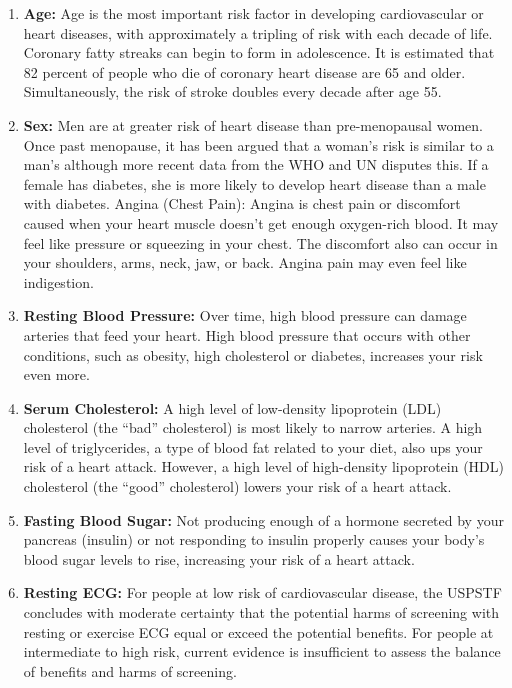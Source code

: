 \documentclass[oneside,12pt]{Classes/VTU}
\begin{document}
	\begin{enumerate}
		\item \textbf{Age:} Age is the most important risk factor in developing cardiovascular or heart diseases, with approximately a tripling of risk with each decade of life. Coronary fatty streaks can begin to form in adolescence. It is estimated that 82 percent of people who die of coronary heart disease are 65 and older. Simultaneously, the risk of stroke doubles every decade after age 55.
		
		\item \textbf{Sex:} Men are at greater risk of heart disease than pre-menopausal women. Once past menopause, it has been argued that a woman’s risk is similar to a man’s although more recent data from the WHO and UN disputes this. If a female has diabetes, she is more likely to develop heart disease than a male with diabetes.
		Angina (Chest Pain): Angina is chest pain or discomfort caused when your heart muscle doesn’t get enough oxygen-rich blood. It may feel like pressure or squeezing in your chest. The discomfort also can occur in your shoulders, arms, neck, jaw, or back. Angina pain may even feel like indigestion.
	
		\item \textbf{Resting Blood Pressure:} Over time, high blood pressure can damage arteries that feed your heart. High blood pressure that occurs with other conditions, such as obesity, high cholesterol or diabetes, increases your risk even more.
		
		\item \textbf{Serum Cholesterol:} A high level of low-density lipoprotein (LDL) cholesterol (the “bad” cholesterol) is most likely to narrow arteries. A high level of triglycerides, a type of blood fat related to your diet, also ups your risk of a heart attack. However, a high level of high-density lipoprotein (HDL) cholesterol (the “good” cholesterol) lowers your risk of a heart attack.
		
		\item \textbf{Fasting Blood Sugar:} Not producing enough of a hormone secreted by your pancreas (insulin) or not responding to insulin properly causes your body’s blood sugar levels to rise, increasing your risk of a heart attack.
		
		\item \textbf{Resting ECG:} For people at low risk of cardiovascular disease, the USPSTF concludes with moderate certainty that the potential harms of screening with resting or exercise ECG equal or exceed the potential benefits. For people at intermediate to high risk, current evidence is insufficient to assess the balance of benefits and harms of screening.
		

\end{enumerate}
\end{document}

